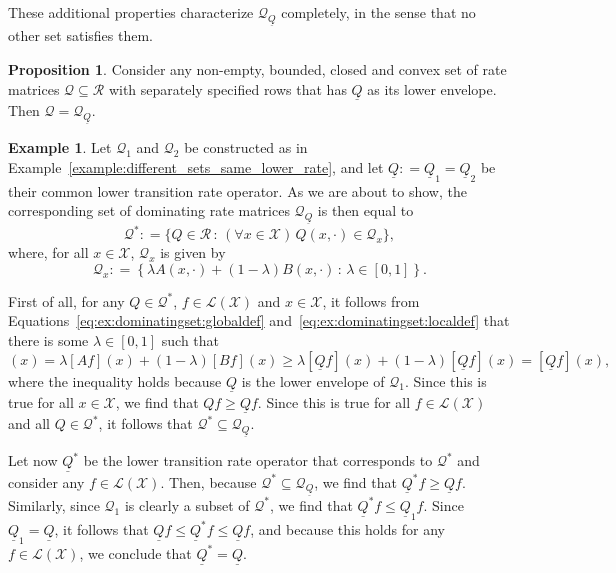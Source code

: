 \documentclass[10pt,a4paper]{paper}
\theoremstyle{definition}
\newtheorem{exmp}{Example}%
\newtheorem{proposition}[theorem]{Proposition}
\newcommand{\states}{\mathcal{X}}
\newcommand{\gambles}{\mathcal{L}}
\newcommand{\gamblesX}{\gambles(\states)}
\newcommand{\rateset}{\mathcal{Q}}
\newcommand{\lrate}{\underline{Q}}
\newcommand{\coloneqq}{:\!=}
\begin{document}
\noindent
These additional properties characterize $\rateset_{\lrate}$ completely, in the sense that no other set satisfies them.

\begin{proposition}\label{prop:dominating_unique_characterization}
Consider any non-empty, bounded, closed and convex set of rate matrices $\rateset\subseteq\mathcal{R}$ with separately specified rows that has $\lrate$ as its lower envelope. Then $\rateset=\rateset_{\lrate}$.
\end{proposition}

\begin{exmp}\label{ex:dominatingset}
Let $\rateset_1$ and $\rateset_2$ be constructed as in Example~\ref{example:different_sets_same_lower_rate}, and let $\lrate\coloneqq\lrate_1=\lrate_2$ be their common lower transition rate operator. As we are about to show, the corresponding set of dominating rate matrices $\rateset_{\lrate}$ is then equal to
\begin{equation}\label{eq:ex:dominatingset:globaldef}
\rateset^* \coloneqq \{Q\in\mathcal{R}\,:\,(\forall x\in\states)\, Q(x,\cdot)\in\rateset_x\},
\end{equation}
where, for all $x\in\states$, $\rateset_x$ is given by
\begin{equation}\label{eq:ex:dominatingset:localdef}
\rateset_x \coloneqq \left\{\lambda A(x,\cdot)+(1-\lambda)B(x,\cdot)\,:\,\lambda\in[0,1]\right\}.
\end{equation}

First of all, for any $Q\in\rateset^*$, $f\in\gamblesX$ and $x\in\states$, it follows from Equations~\eqref{eq:ex:dominatingset:globaldef} and~\eqref{eq:ex:dominatingset:localdef} that there is some $\lambda\in[0,1]$ such that
\begin{equation*}
[Qf](x)=\lambda[Af](x)+(1-\lambda)[Bf](x)
\geq\lambda[\lrate f](x)+(1-\lambda)[\lrate f](x)
=[\lrate f](x),
\end{equation*}
where the inequality holds because $\lrate$ is the lower envelope of $\rateset_1$. Since this is true for all $x\in\states$, we find that $Qf\geq\lrate f$. Since this is true for all $f\in\gamblesX$ and all $Q\in\rateset^*$, it follows that $\rateset^*\subseteq\rateset_{\lrate}$. 


Let now $\lrate^*$ be the lower transition rate operator that corresponds to $\rateset^*$ and consider any $f\in\gamblesX$. Then, because $\rateset^*\subseteq\rateset_{\lrate}$, we find that $\lrate^*f\geq\lrate f$. Similarly, since $\rateset_1$ is clearly a subset of $\rateset^*$, we find that $\lrate^*f\leq\lrate_1f$. Since $\lrate_1=\lrate$, it follows that $\lrate f\leq \lrate^*f\leq \lrate f$, and because this holds for any $f\in\gamblesX$, we conclude that $\lrate^*=\lrate$.



\end{exmp}
\end{document}
